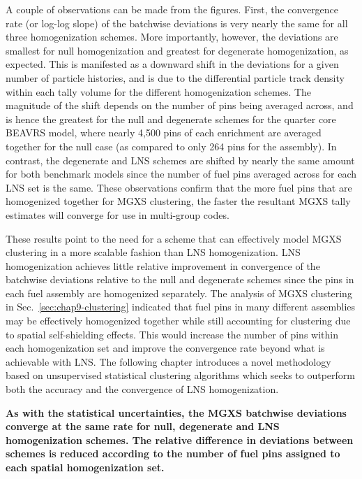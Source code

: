 A couple of observations can be made from the figures. First, the convergence rate (or log-log slope) of the batchwise deviations is very nearly the same for all three homogenization schemes. More importantly, however, the deviations are smallest for null homogenization and greatest for degenerate homogenization, as expected. This is manifested as a downward shift in the deviations for a given number of particle histories, and is due to the differential particle track density within each tally volume for the different homogenization schemes. The magnitude of the shift depends on the number of pins being averaged across, and is hence the greatest for the null and degenerate schemes for the quarter core \ac{BEAVRS} model, where nearly 4,500 pins of each enrichment are averaged together for the null case (as compared to only 264 pins for the assembly). In contrast, the degenerate and \ac{LNS} schemes are shifted by nearly the same amount for both benchmark models since the number of fuel pins averaged across for each \ac{LNS} set is the same. These observations confirm that the more fuel pins that are homogenized together for \ac{MGXS} clustering, the faster the resultant \ac{MGXS} tally estimates will converge for use in multi-group codes.

These results point to the need for a scheme that can effectively model \ac{MGXS} clustering in a more scalable fashion than \ac{LNS} homogenization. \ac{LNS} homogenization achieves little relative improvement in convergence of the batchwise deviations relative to the null and degenerate schemes since the pins in each fuel assembly are homogenized separately. The analysis of \ac{MGXS} clustering in Sec.~\ref{sec:chap9-clustering} indicated that fuel pins in many different assemblies may be effectively homogenized together while still accounting for clustering due to spatial self-shielding effects. This would increase the number of pins within each homogenization set and improve the convergence rate beyond what is achievable with \ac{LNS}. The following chapter introduces a novel methodology based on unsupervised statistical clustering algorithms which seeks to outperform both the accuracy and the convergence of \ac{LNS} homogenization.

\begin{emphbox}
\textbf{As with the statistical uncertainties, the \ac{MGXS} batchwise deviations converge at the same rate for null, degenerate and \ac{LNS} homogenization schemes. The relative difference in deviations between schemes is reduced according to the number of fuel pins assigned to each spatial homogenization set.}
\end{emphbox}

